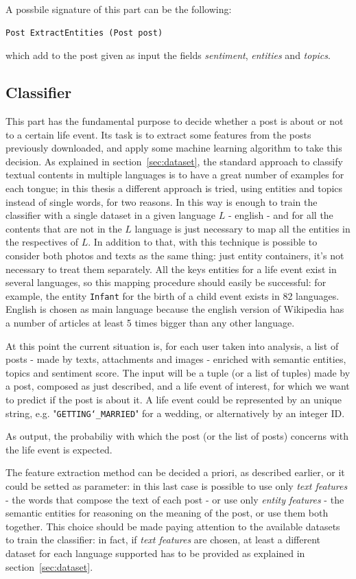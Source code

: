 A possbile signature of this part can be the following:
\begin{Verbatim}
Post ExtractEntities (Post post)
\end{Verbatim}
which add to the post given as input the fields \textit{sentiment}, \textit{entities} and \textit{topics}.

\subsection{Classifier}
This part has the fundamental purpose to decide whether a post is about or not to a certain life event. Its task is to extract some features from the posts previously downloaded, and apply some machine learning algorithm to take this decision. As explained in section~\ref{sec:dataset}, the standard approach to classify textual contents in multiple languages is to have a great number of examples for each tongue; in this thesis a different approach is tried, using entities and topics instead of single words, for two reasons. In this way is enough to train the classifier with a single dataset in a given language $ L $ - english - and for all the contents that are not in the $ L $ language is just necessary to map all the entities in the respectives of $L$. In addition to that, with this technique is possible to consider both photos and texts as the same thing: just entity containers, it's not necessary to treat them separately. All the keys entities for a life event exist in several languages, so this mapping procedure should easily be successful: for example, the entity \texttt{Infant} for the birth of a child event exists in 82 languages. English is chosen as main language because the english version of Wikipedia has a number of articles at least 5 times bigger than any other language.

At this point the current situation is, for each user taken into analysis, a list of posts - made by texts, attachments and images - enriched with semantic entities, topics and sentiment score. The input will be a tuple (or a list of tuples) made by a post, composed as just described, and a life event of interest, for which we want to predict if the post is about it. A life event could be represented by an unique string, e.g. "\texttt{GETTING\char`_MARRIED}" for a wedding, or alternatively by an integer ID.

As output, the probabiliy with which the post (or the list of posts) concerns with the life event is expected.

The feature extraction method can be decided a priori, as described earlier, or it could be setted as parameter: in this last case is possible to use only \textit{text features} - the words that compose the text of each post - or use only \textit{entity features} - the semantic entities for reasoning on the meaning of the post, or use them both together. This choice should be made paying attention to the available datasets to train the classifier: in fact, if \textit{text features} are chosen, at least a different dataset for each language supported has to be provided as explained in section~\ref{sec:dataset}.

